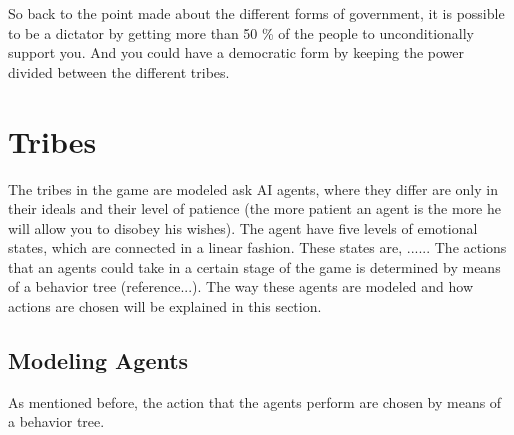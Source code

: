 \documentclass[11pt,a4paper]{article}
\begin{document}
So back to the point made about the different forms of government, it is possible to be a dictator by getting more than 50 \% of the people to unconditionally support you. And you could have a democratic form by keeping the power divided between the different tribes.

\section{Tribes}
The tribes in the game are modeled ask AI agents, where they differ are only in their ideals and their level of patience (the more patient an agent is the more he will allow you to disobey his wishes). The agent have five levels of emotional states, which are connected in a linear fashion. These states are, ...... The actions that an agents could take in a certain stage of the game is determined by means of a behavior tree (reference...). The way these agents are modeled and how actions are chosen will be explained in this section. 

\subsection{Modeling Agents}
As mentioned before, the action that the agents perform are chosen by means of a behavior tree. 
\end{document}
